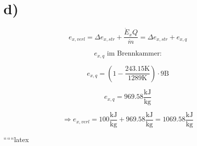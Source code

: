 

\section*{d)}

\[
e_{x,verl} = \Delta e_{x,str} + \frac{\dot{E}_x Q}{\dot{m}} = \Delta e_{x,str} + e_{x,q}
\]

\[
e_{x,q} \text{ im Brennkammer:}
\]

\[
e_{x,q} = \left( 1 - \frac{243.15 \text{K}}{1289 \text{K}} \right) \cdot 9 \text{B}
\]

\[
e_{x,q} = 969.58 \frac{\text{kJ}}{\text{kg}}
\]

\[
\Rightarrow e_{x,verl} = 100 \frac{\text{kJ}}{\text{kg}} + 969.58 \frac{\text{kJ}}{\text{kg}} = 1069.58 \frac{\text{kJ}}{\text{kg}}
\]

``````latex